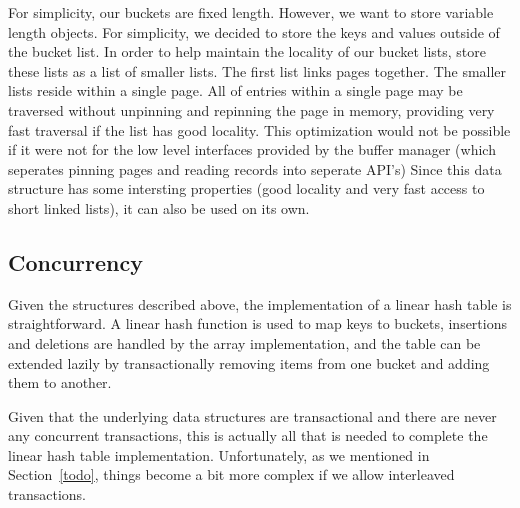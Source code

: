\documentclass[letterpaper,twocolumn,english]{article}
\newcommand{\yad}{Lemon\xspace}
\begin{document}
For simplicity, our buckets are fixed length.  However, we want to
store variable length objects.  For simplicity, we decided to store 
the keys and values outside of the bucket list.
In order to help maintain the locality of our bucket lists, store these lists as a list of smaller lists.  The first list links pages together.  The smaller lists reside within a single page.
All of entries within a single page may be traversed without 
unpinning and repinning the page in memory, providing very fast
traversal if the list has good locality.
This optimization would not be possible if it
were not for the low level interfaces provided by the buffer manager
(which seperates pinning pages and reading records into seperate
API's)  Since this data structure has some intersting 
properties (good locality and very fast access to short linked lists), it can also be used on its own.

\subsection{Concurrency}

Given the structures described above, the implementation of a linear hash
table is straightforward.  A linear hash function is used to map keys
to buckets, insertions and deletions are handled by the array implementation,
and the table can be extended lazily by transactionally removing items
from one bucket and adding them to another.

Given that the underlying data structures are transactional and there
are never any concurrent transactions, this is actually all that is
needed to complete the linear hash table implementation.
Unfortunately, as we mentioned in Section~\ref{todo}, things become a
bit more complex if we allow interleaved transactions. 
\end{document}

